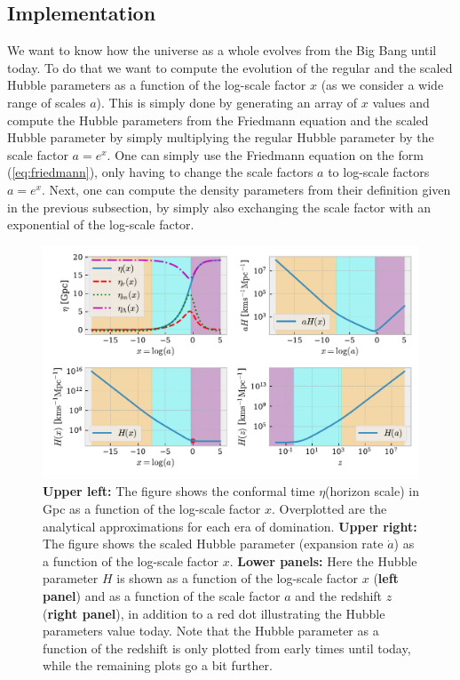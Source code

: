 \documentclass[twocolumn]{aastex62}
\begin{document}
\subsection{Implementation}

We want to know how the universe as a whole evolves from the Big Bang until
today. To do that we want to compute the evolution of the regular and the scaled
Hubble parameters as a function of the log-scale factor $x$ (as we consider a wide
range of scales $a$). This is simply done by generating an array of $x$ values
and compute the Hubble parameters from the Friedmann equation
and the scaled Hubble parameter by simply multiplying the
regular Hubble parameter by the scale factor $a = e^x$. One can simply use the
Friedmann equation on the form (\ref{eq:friedmann}), only having to change the
scale factors $a$ to log-scale factors $a = e^x$. Next, one can compute the
density parameters from their definition given in the previous subsection, by
simply also exchanging the scale factor with an exponential of the log-scale
factor. 
\begin{figure}
    \includegraphics[scale=1]{Figures/Eta_&_H_of_x.pdf}
    \caption{\textbf{Upper left:} The figure shows the conformal time $\eta$(horizon scale) in Gpc as a function of the log-scale factor $x$. Overplotted are the analytical approximations for each era of domination. \textbf{Upper right:} The figure shows the scaled Hubble parameter (expansion rate $\dot{a}$) as a function of the log-scale factor $x$. \textbf{Lower panels:} Here the Hubble parameter $H$ is shown as a function of the log-scale factor $x$ (\textbf{left panel}) and as a function of the scale factor $a$ and the redshift $z$ (\textbf{right panel}), in addition to a red dot illustrating the Hubble parameters value today. Note that the Hubble parameter as a function of the redshift is only plotted from early times until today, while the remaining plots go a bit further.}
    \label{fig:Eta}
\end{figure}
\end{document}
